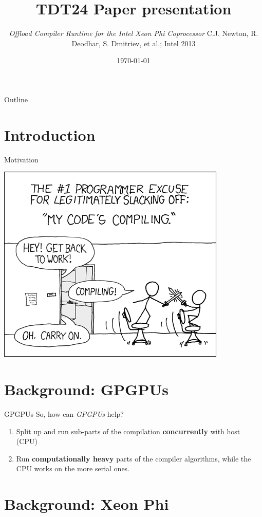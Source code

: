 \documentclass[screen]{beamer}
\title[Compiler Offloading]{TDT24 Paper presentation}
\subtitle{\textit{Offload Compiler Runtime for the Intel Xeon Phi Coprocessor}
\newline C.J. Newton, R. Deodhar, S. Dmitriev, et al.; Intel 2013}
\institute[IDI - NTNU]{Institutt for Datateknikk og Informasjonsvitenskap}
\date[November 2014]{\today} %
\begin{document}
\ntnutitlepage

\begin{frame}{Outline}
    \tableofcontents
\end{frame}

\section{Introduction}

\begin{frame}{Motivation}
    \pause
    \begin{center}
        \includegraphics[width=0.5\linewidth]{compiling.png}
    \end{center}
\end{frame}

\section{Background: GPGPUs}

\begin{frame}{GPGPUs}
    So, how can \textit{GPGPUs} help?
    \begin{enumerate}[<+-| alert@+>]
        \item Split up and run sub-parts of the compilation \textbf{concurrently} with host (CPU)
        \item Run \textbf{computationally heavy} parts of the compiler algorithms, while the CPU works on the more serial ones.
    \end{enumerate}
\end{frame}

\section{Background: Xeon Phi}
\end{document}
